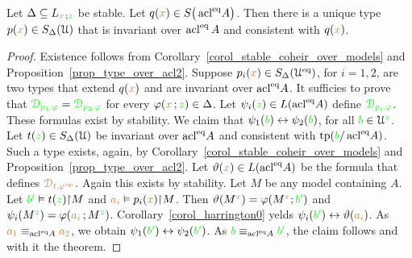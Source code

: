 \begin{theorem}[ (Stationarity)]\label{thm_stationarity}
  Let $\Delta\subseteq L_{{\color{brown} x}\,;{\color{green} z}}$ be stable.
  Let $q({\color{brown} x})\in S\big(\mathop{\rm acl}^{{\rm eq}}\!A\big)$.
  Then there is a unique type $p({\color{brown} x})\in S_\Delta(\EuScript U)$ that is invariant over $\mathop{\rm acl}^{{\rm eq}} A$ and consistent with $q({\color{brown} x})$.
\end{theorem}

\begin{proof}
  Existence follows from Corollary~\ref{corol_stable_coheir_over_models} and Proposition~\ref{prop_type_over_acl2}.
  Suppose $p_i({\color{brown} x})\in S_\Delta(\EuScript U^{{\rm eq}})$, for $i=1,2$, are two types that extend $q({\color{brown} x})$ and are invariant over $\mathop{\rm acl}^{{\rm eq}}\!A$.
  It sufficies to prove that ${\color{green}\EuScript D_{p_1,\varphi}}={\color{green}\EuScript D_{p_2,\varphi}}$ for every $\varphi({\color{brown} x}\,;{\color{green} z})\in\Delta$.
  Let $\psi_i({\color{green} z})\in L(\mathop{\rm acl}^{{\rm eq}}\!A)$ define ${\color{green}\EuScript D_{p_i,\varphi}}$.
  These formulas exist by stability.
  We claim that $\psi_1({\color{green} b})\leftrightarrow\psi_2({\color{green} b})$, for all ${\color{green} b}\in\EuScript U^{\color{green} z}$.
  Let $t({\color{green} z})\in S_\Delta(\EuScript U)$ be invariant over $\mathop{\rm acl}^{{\rm eq}}\!A$ and consistent with ${\rm tp}({\color{green} b}/\mathop{\rm acl}^{{\rm eq}}\!A)$.
  Such a type exists, again, by Corollary~\ref{corol_stable_coheir_over_models} and Proposition~\ref{prop_type_over_acl2}.
  Let $\vartheta({\color{brown} x})\in L(\mathop{\rm acl}^{{\rm eq}}\!A)$ be the formula that defines ${\color{brown}\EuScript D_{t,\varphi^{\rm op}}}$.
  Again this exists by stability.
  Let $M$ be any model containing $A$.
  Let ${\color{green} b'}\vDash t({\color{green} z}){\restriction}M$ and ${\color{brown} a_i}\vDash p_i({\color{brown} x}){\restriction}M$.
  Then $\vartheta(M^{\color{brown} x})=\varphi(M^{\color{brown} x};{\color{green} b'})$ and $\psi_i(M^{\color{green} z})=\varphi({\color{brown} a_i}\,;M^{\color{green} z})$.
  Corollary~\ref{corol_harrington0} yelds $\psi_i({\color{green} b'})\leftrightarrow\vartheta({\color{brown} a_i})$.
  As ${\color{brown} a_1}\equiv_{\mathop{\rm acl}^{{\rm eq}}\!A}{\color{brown} a_2}$, we obtain $\psi_1({\color{green} b'})\leftrightarrow\psi_2({\color{green} b'})$.
  As ${\color{green} b}\equiv_{\mathop{\rm acl}^{{\rm eq}}\!A}{\color{green} b'}$, the claim follows and with it the theorem.
\end{proof}



